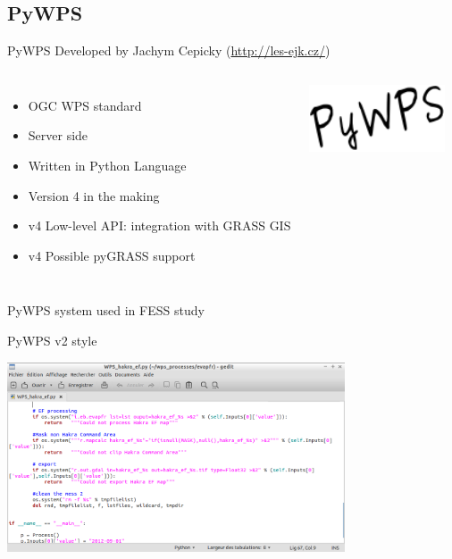 \documentclass[xcolor=dvipsnames,beamer]{beamer} %
\begin{document}
\subsection{PyWPS}
\begin{frame}[fragile]{PyWPS}
 Developed by Jachym Cepicky (\href{http://les-ejk.cz/}{http://les-ejk.cz/})
\begin{columns}[l]
 \begin{itemize}
  \item OGC WPS standard
  \item Server side
  \item Written in Python Language
  \item Version 4 in the making
  \item v4 Low-level API: integration with GRASS GIS
  \item v4 Possible pyGRASS support
 \end{itemize}

\begin{flushright}
  \includegraphics[width=4cm]{pywps}
\end{flushright}
\end{columns}
\hspace{10mm}
\end{frame}

\begin{frame}[fragile]{PyWPS system used in FESS study}

\begin{block}{PyWPS v2 style}
\begin{center}
\includegraphics[width=10cm]{pywps_hakra}
\end{center}
\end{block}
\end{frame}
\end{document}
